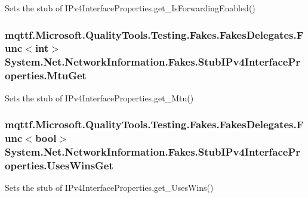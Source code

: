 Sets the stub of I\-Pv4\-Interface\-Properties.\-get\-\_\-\-Is\-Forwarding\-Enabled()

\hypertarget{class_system_1_1_net_1_1_network_information_1_1_fakes_1_1_stub_i_pv4_interface_properties_a93ca9901449e7e0c89efd044ade7e002}{
\subsubsection[{Mtu\-Get}]{\setlength{\rightskip}{0pt plus 5cm}mqttf.\-Microsoft.\-Quality\-Tools.\-Testing.\-Fakes.\-Fakes\-Delegates.\-Func$<$int$>$ System.\-Net.\-Network\-Information.\-Fakes.\-Stub\-I\-Pv4\-Interface\-Properties.\-Mtu\-Get}}\label{class_system_1_1_net_1_1_network_information_1_1_fakes_1_1_stub_i_pv4_interface_properties_a93ca9901449e7e0c89efd044ade7e002}


Sets the stub of I\-Pv4\-Interface\-Properties.\-get\-\_\-\-Mtu()

\hypertarget{class_system_1_1_net_1_1_network_information_1_1_fakes_1_1_stub_i_pv4_interface_properties_aa1d467cdd1aa0bd3bdec1d9194607f3b}{
\subsubsection[{Uses\-Wins\-Get}]{\setlength{\rightskip}{0pt plus 5cm}mqttf.\-Microsoft.\-Quality\-Tools.\-Testing.\-Fakes.\-Fakes\-Delegates.\-Func$<$bool$>$ System.\-Net.\-Network\-Information.\-Fakes.\-Stub\-I\-Pv4\-Interface\-Properties.\-Uses\-Wins\-Get}}\label{class_system_1_1_net_1_1_network_information_1_1_fakes_1_1_stub_i_pv4_interface_properties_aa1d467cdd1aa0bd3bdec1d9194607f3b}


Sets the stub of I\-Pv4\-Interface\-Properties.\-get\-\_\-\-Uses\-Wins()



